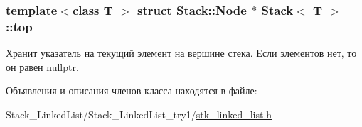 \subsubsection[{top\+\_\+}]{\setlength{\rightskip}{0pt plus 5cm}template$<$class T $>$ struct {\bf Stack\+::\+Node} $\ast$  {\bf Stack}$<$ T $>$\+::top\+\_\+\hspace{0.3cm}{\ttfamily [private]}}\label{class_stack_a4fa8fe1a2a6ff42f954d6a3c0d29d6e0}


Хранит указатель на текущий элемент на вершине стека. Если элементов нет, то он равен nullptr. 



Объявления и описания членов класса находятся в файле\+:\begin{DoxyCompactItemize}
\item 
Stack\+\_\+\+Linked\+List/\+Stack\+\_\+\+Linked\+List\+\_\+try1/\hyperlink{stk__linked__list_8h}{stk\+\_\+linked\+\_\+list.\+h}\end{DoxyCompactItemize}
